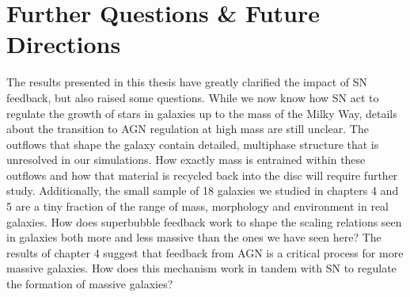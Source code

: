 \section{Further Questions \& Future Directions}
The results presented in this thesis have greatly clarified the impact of SN
feedback, but also raised some questions.  While we now know how SN act to
regulate the growth of stars in galaxies up to the mass of the Milky Way,
details about the transition to AGN regulation at high mass are still unclear.
The outflows that shape the galaxy contain detailed, multiphase structure that
is unresolved in our simulations.  How exactly mass is entrained within these
outflows and how that material is recycled back into the disc will require
further study.  Additionally, the small sample of 18 galaxies we studied in
chapters 4 and 5 are a tiny fraction of the range of mass, morphology and
environment in real galaxies.  How does superbubble feedback work to shape the
scaling relations seen in galaxies both more and less massive than the ones we
have seen here?  The results of chapter 4 suggest that feedback from AGN is a
critical process for more massive galaxies.  How does this mechanism work in
tandem with SN to regulate the formation of massive galaxies?

